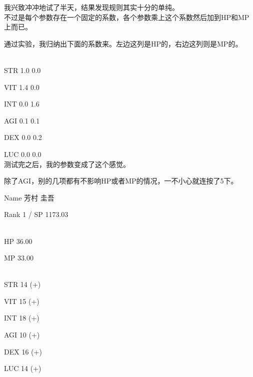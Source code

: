 我兴致冲冲地试了半天，结果发现规则其实十分的单纯。\\

不过是每个参数存在一个固定的系数，各个参数乘上这个系数然后加到HP和MP上而已。

通过实验，我归纳出下面的系数来。左边这列是HP的，右边这列则是MP的。

%  
\\

STR	1.0	0.0

VIT	1.4	0.0

INT	0.0	1.6

AGI	0.1	0.1

DEX	0.0	0.2

LUC	0.0	0.0\\

测试完之后，我的参数变成了这个感觉。

除了AGI，别的几项都有不影响HP或者MP的情况，一不小心就连按了5下。\\

\cardline

  Name 芳村 圭吾

  Rank 1 / SP 1173.03

%  
\\

  HP  36.00

  MP  33.00

%  
\\

  STR 14 (+)

  VIT 15 (+)

  INT 18 (+)

  AGI 10 (+)

  DEX 16 (+)

  LUC 14 (+)

\cardline\\

